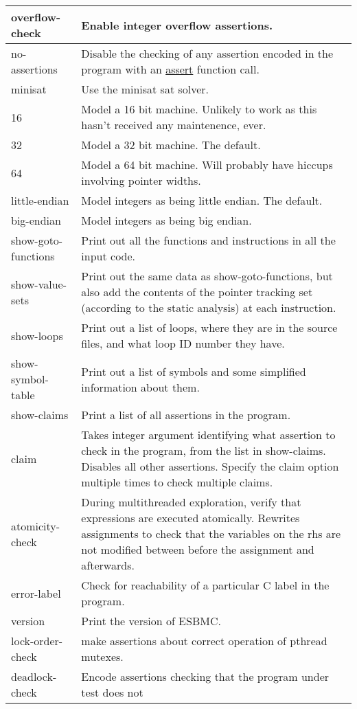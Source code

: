 \documentclass{article}
\begin{document}
\begin{longtable}{| p{} | p{} |}
\hline
overflow-check & Enable integer overflow assertions.\\
\hline
no-assertions & Disable the checking of any assertion encoded in the program
with an \url{assert} function call.\\
\hline
minisat & Use the minisat sat solver.\\
\hline
16 & Model a 16 bit machine. Unlikely to work as this hasn't received any
maintenence, ever.\\
\hline
32 & Model a 32 bit machine. The default.\\
\hline
64 & Model a 64 bit machine. Will probably have hiccups involving pointer
widths.\\
\hline
little-endian & Model integers as being little endian. The default.\\
\hline
big-endian & Model integers as being big endian.\\
\hline
show-goto-functions & Print out all the functions and instructions in all the
input code.\\
\hline
show-value-sets & Print out the same data as show-goto-functions, but also
add the contents of the pointer tracking set (according to the static analysis)
at each instruction.\\
\hline
show-loops & Print out a list of loops, where they are in the source files,
and what loop ID number they have.\\
\hline
show-symbol-table & Print out a list of symbols and some simplified
information about them.\\
\hline
show-claims & Print a list of all assertions in the program.\\
\hline
claim & Takes integer argument identifying what assertion to check in the
program, from the list in show-claims. Disables all other assertions. Specify
the claim option multiple times to check multiple claims.\\
\hline
atomicity-check & During multithreaded exploration, verify that expressions
are executed atomically. Rewrites assignments to check that the variables on the
rhs are not modified between before the assignment and afterwards.\\
\hline
error-label & Check for reachability of a particular C label in the program.\\
\hline
version & Print the version of ESBMC.\\
\hline
lock-order-check & make assertions about correct operation of pthread
mutexes.\\
\hline
deadlock-check & Encode assertions checking that the program under test does not

\end{longtable}
\end{document}

